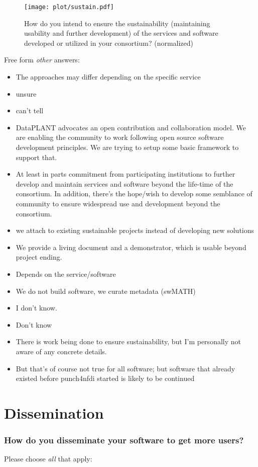 \documentclass[headsepline,titlepage,twoside,12pt,toc=flat,headings=normal]{scrreprt}
\newcommand{\question}[1]{\subsubsection{#1}}
\begin{document}
\begin{figure}[h!]
\caption{How do you intend to ensure the sustainability (maintaining usability and further development) of the services and software developed or utilized in your consortium? (normalized)}
\label{fig:sustain_n}
\texttt{[image: plot/sustain.pdf]}
\end{figure}

Free form \emph{other} answers:
\begin{itemize}
\item The approaches may differ depending on the specific service
\item unsure
\item can't tell
\item DataPLANT advocates an open contribution and collaboration model. We are enabling the community to work following open source software development principles. We are trying to setup some basic framework to support that.
\item At least in parts commitment from participating institutions to further develop and maintain services and software beyond the life-time of the consortium. In addition, there's the hope/wish to develop some semblance of community to ensure widespread use and development beyond the consortium.
\item we attach to existing sustainable projects instead of developing new solutions 
\item We provide a living document and a demonstrator, which is usable beyond project ending.
\item Depends on the service/software
\item We do not build software, we curate metadata (swMATH)
\item I don't know.
\item Don't know
\item There is work being done to ensure sustainability, but I'm personally not aware of any concrete details. 
\item But that's of course not true for all software; but software that already existed before punch4nfdi started is likely to be continued
\end{itemize}


\section{Dissemination}
\question{How do you disseminate your software to get more users?}\label{how-do-you-disseminate-your-software-to-get-more-users}
Please choose \emph{all} that apply:
\end{document}
